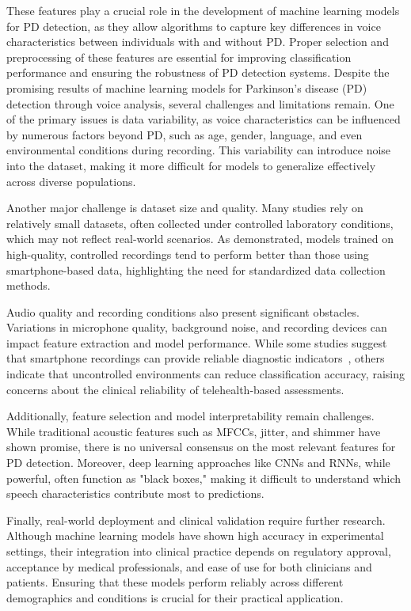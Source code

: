 \documentclass{paper}
\begin{document}
These features play a crucial role in the development of machine learning models for PD detection, as they allow algorithms to capture key differences in voice characteristics between individuals with and without PD. Proper selection and preprocessing of these features are essential for improving classification performance and ensuring the robustness of PD detection systems.
Despite the promising results of machine learning models for Parkinson’s disease (PD) detection through voice analysis, several challenges and limitations remain. One of the primary issues is data variability, as voice characteristics can be influenced by numerous factors beyond PD, such as age, gender, language, and even environmental conditions during recording. This variability can introduce noise into the dataset, making it more difficult for models to generalize effectively across diverse populations.

Another major challenge is dataset size and quality. Many studies rely on relatively small datasets, often collected under controlled laboratory conditions, which may not reflect real-world scenarios. As \citet{carron2021mobile} demonstrated, models trained on high-quality, controlled recordings tend to perform better than those using smartphone-based data, highlighting the need for standardized data collection methods.

Audio quality and recording conditions also present significant obstacles. Variations in microphone quality, background noise, and recording devices can impact feature extraction and model performance. While some studies suggest that smartphone recordings can provide reliable diagnostic indicators~\cite{uloza2015exploring}, others indicate that uncontrolled environments can reduce classification accuracy, raising concerns about the clinical reliability of telehealth-based assessments.

Additionally, feature selection and model interpretability remain challenges. While traditional acoustic features such as MFCCs, jitter, and shimmer have shown promise, there is no universal consensus on the most relevant features for PD detection. Moreover, deep learning approaches like CNNs and RNNs, while powerful, often function as "black boxes," making it difficult to understand which speech characteristics contribute most to predictions.

Finally, real-world deployment and clinical validation require further research. Although machine learning models have shown high accuracy in experimental settings, their integration into clinical practice depends on regulatory approval, acceptance by medical professionals, and ease of use for both clinicians and patients. Ensuring that these models perform reliably across different demographics and conditions is crucial for their practical application.
\end{document}
